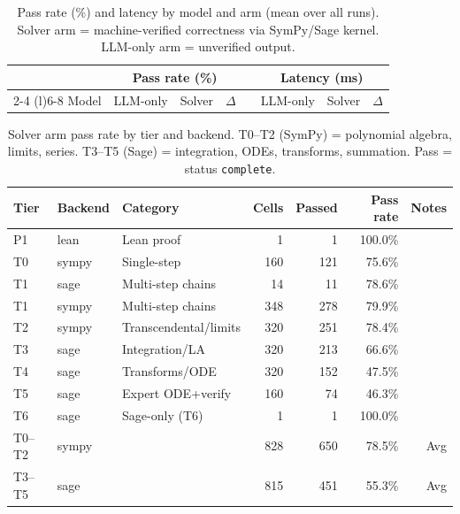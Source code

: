 
\begin{table}[t]
\centering
\caption{Pass rate (\%) and latency by model and arm (mean over all runs). Solver arm = machine-verified correctness via SymPy/Sage kernel. LLM-only arm = unverified output.}
\label{tab:results-by-model}
\begin{tabular}{@{}lrrrrrrr@{}}
\toprule
 & \multicolumn{3}{c}{Pass rate (\%)} & & \multicolumn{3}{c}{Latency (ms)} \\
\cmidrule(lr){2-4} \cmidrule(l){6-8}
Model & LLM-only & Solver & $\Delta$ & & LLM-only & Solver & $\Delta$ \\
\midrule
\bottomrule
\end{tabular}
\end{table}


\begin{table}[t]
\centering
\caption{Solver arm pass rate by tier and backend. T0--T2 (SymPy) = polynomial algebra, limits, series. T3--T5 (Sage) = integration, ODEs, transforms, summation. Pass = status \texttt{complete}.}
\label{tab:results-by-tier}
\begin{tabular}{@{}p{0.8cm}p{1.0cm}p{4.0cm}rrrr@{}}
\toprule
Tier & Backend & Category & Cells & Passed & Pass rate & Notes \\
\midrule
P1 & lean   & Lean proof                     &    1 &      1 & 100.0\% &  \\
T0 & sympy  & Single-step                    &  160 &    121 &  75.6\% &  \\
T1 & sage   & Multi-step chains              &   14 &     11 &  78.6\% &  \\
T1 & sympy  & Multi-step chains              &  348 &    278 &  79.9\% &  \\
T2 & sympy  & Transcendental/limits          &  320 &    251 &  78.4\% &  \\
T3 & sage   & Integration/LA                 &  320 &    213 &  66.6\% &  \\
T4 & sage   & Transforms/ODE                 &  320 &    152 &  47.5\% &  \\
T5 & sage   & Expert ODE+verify              &  160 &     74 &  46.3\% &  \\
T6 & sage   & Sage-only (T6)                 &    1 &      1 & 100.0\% &  \\
\midrule
T0--T2 & sympy & &  828 &    650 &  78.5\% & Avg \\
T3--T5 & sage & &  815 &    451 &  55.3\% & Avg \\
\bottomrule
\end{tabular}
\end{table}


